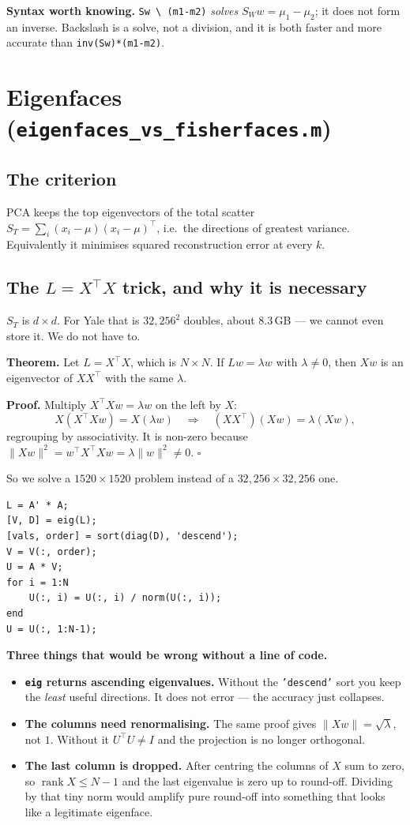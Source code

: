 \documentclass[11pt]{article}
\newcommand{\T}{^{\top}}
\begin{document}
\textbf{Syntax worth knowing.} \verb|Sw \ (m1-m2)| \emph{solves}
$S_Ww=\mu_1-\mu_2$; it does not form an inverse. Backslash is a solve, not a
division, and it is both faster and more accurate than \texttt{inv(Sw)*(m1-m2)}.

\section{Eigenfaces (\texttt{eigenfaces\_vs\_fisherfaces.m})}

\subsection{The criterion}
PCA keeps the top eigenvectors of the total scatter
$S_T=\sum_i(x_i-\mu)(x_i-\mu)\T$, i.e.\ the directions of greatest variance.
Equivalently it minimises squared reconstruction error at every $k$.

\subsection{The $L=X\T X$ trick, and why it is necessary}
$S_T$ is $d\times d$. For Yale that is $32{,}256^2$ doubles, about $8.3$\,GB ---
we cannot even store it. We do not have to.

\textbf{Theorem.} Let $L=X\T X$, which is $N\times N$. If $Lw=\lambda w$ with
$\lambda\ne0$, then $Xw$ is an eigenvector of $XX\T$ with the same $\lambda$.

\textbf{Proof.} Multiply $X\T Xw=\lambda w$ on the left by $X$:
\[ X(X\T Xw)=X(\lambda w)\quad\Longrightarrow\quad (XX\T)(Xw)=\lambda(Xw), \]
regrouping by associativity. It is non-zero because
$\|Xw\|^2=w\T X\T Xw=\lambda\|w\|^2\ne0$. $\square$

So we solve a $1520\times1520$ problem instead of a $32{,}256\times32{,}256$ one.

\begin{lstlisting}
L = A' * A;
[V, D] = eig(L);
[vals, order] = sort(diag(D), 'descend');
V = V(:, order);
U = A * V;
for i = 1:N
    U(:, i) = U(:, i) / norm(U(:, i));
end
U = U(:, 1:N-1);
\end{lstlisting}

\textbf{Three things that would be wrong without a line of code.}
\begin{itemize}
\item \textbf{\texttt{eig} returns ascending eigenvalues.} Without the
  \texttt{'descend'} sort you keep the \emph{least} useful directions. It does
  not error --- the accuracy just collapses.
\item \textbf{The columns need renormalising.} The same proof gives
  $\|Xw\|=\sqrt\lambda$, not $1$. Without it $U\T U\ne I$ and the projection
  is no longer orthogonal.
\item \textbf{The last column is dropped.} After centring the columns of $X$
  sum to zero, so $\operatorname{rank}X\le N-1$ and the last eigenvalue is zero
  up to round-off. Dividing by that tiny norm would amplify pure round-off into
  something that looks like a legitimate eigenface.
\end{itemize}
\end{document}
